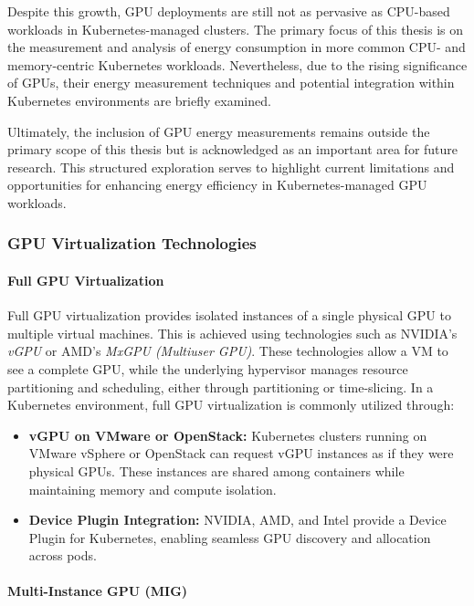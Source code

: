 Despite this growth, GPU deployments are still not as pervasive as CPU-based workloads in Kubernetes-managed clusters. The primary focus of this thesis is on the measurement and analysis of energy consumption in more common CPU- and memory-centric Kubernetes workloads. Nevertheless, due to the rising significance of GPUs, their energy measurement techniques and potential integration within Kubernetes environments are briefly examined.

Ultimately, the inclusion of GPU energy measurements remains outside the primary scope of this thesis but is acknowledged as an important area for future research. This structured exploration serves to highlight current limitations and opportunities for enhancing energy efficiency in Kubernetes-managed GPU workloads.

\subsubsection{GPU Virtualization Technologies}

\paragraph{Full GPU Virtualization}

Full GPU virtualization provides isolated instances of a single physical GPU to multiple virtual machines. This is achieved using technologies such as NVIDIA's \textit{vGPU} or AMD's \textit{MxGPU (Multiuser GPU)}. These technologies allow a VM to see a complete GPU, while the underlying hypervisor manages resource partitioning and scheduling\cite{nvidia_virtualization, amd_instinct_virtualization}, either through partitioning or time-slicing. In a Kubernetes environment, full GPU virtualization is commonly utilized through:
\begin{itemize}
    \item \textbf{vGPU on VMware or OpenStack:} Kubernetes clusters running on VMware vSphere or OpenStack can request vGPU instances as if they were physical GPUs. These instances are shared among containers while maintaining memory and compute isolation.
    \item \textbf{Device Plugin Integration:} NVIDIA, AMD, and Intel provide a Device Plugin for Kubernetes, enabling seamless GPU discovery and allocation across pods\cite{k8s_gpu_support}.
\end{itemize}

\paragraph{Multi-Instance GPU (MIG)}

